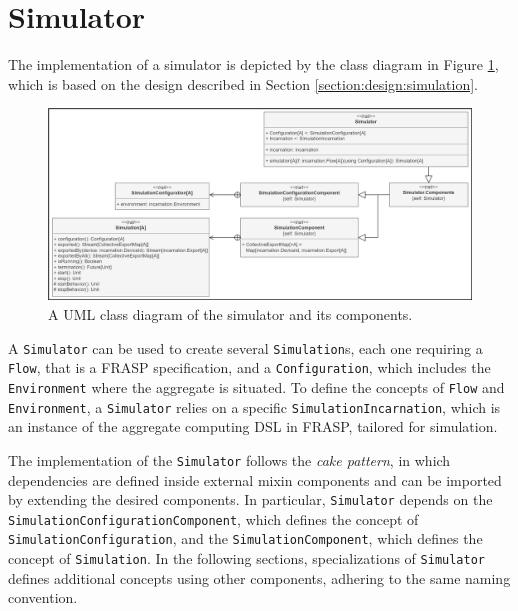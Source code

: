 
\section{Simulator}
\label{section:implementation:simulator}

The implementation of a simulator is depicted by the class diagram in Figure
\ref{figure:simulator-class-diagram}, which is based on the design described in
Section \ref{section:design:simulation}.

\begin{figure}[!ht]
  \centering
  \includegraphics[width=1\textwidth]{resources/figures/simulator-class-diagram.png}
  \caption[A UML class diagram of the simulator]{
    A UML class diagram of the simulator and its components.
  }
  \label{figure:simulator-class-diagram}
\end{figure}

A \texttt{Simulator} can be used to create several \texttt{Simulation}s, each
one requiring a \texttt{Flow}, that is a FRASP specification, and a
\texttt{Configuration}, which includes the \texttt{Environment} where the
aggregate is situated. To define the concepts of \texttt{Flow} and
\texttt{Environment}, a \texttt{Simulator} relies on a specific
\texttt{SimulationIncarnation}, which is an instance of the aggregate computing
\ac{DSL} in FRASP, tailored for simulation.

The implementation of the \texttt{Simulator} follows the \textit{cake pattern},
in which dependencies are defined inside external mixin components and can be
imported by extending the desired components. In particular, \texttt{Simulator}
depends on the \texttt{Simula\-tionConfigurationComponent}, which defines the
concept of \texttt{SimulationConfi\-guration}, and the
\texttt{SimulationCompo\-nent}, which defines the concept of
\texttt{Simula\-tion}. In the following sections, specializations of
\texttt{Simulator} defines additional concepts using other components, adhering
to the same naming convention.

